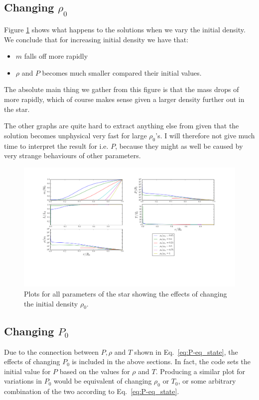 \documentclass[11pt,twocolumn]{article}
\begin{document}
\subsection{Changing $\rho_0$}
Figure \ref{fig:rho-variation} shows what happens to the solutions
when we vary the initial density. We conclude that for increasing
initial density we have that:

\begin{itemize}
\item $m$ falls off more rapidly
\item $\rho$ and $P$ becomes much smaller compared their initial
  values.
\end{itemize}

The absolute main thing we gather from this figure is that the mass
drops of more rapidly, which of course makes sense given a larger
density further out in the star. 

The other graphs are quite hard to extract anything else from given
that the solution becomes unphysical very fast for large
$\rho_0$'s. I will therefore not give much time to interpret the
result for i.e. $P$, because they might as well be caused by very
strange behaviours of other parameters. 

\begin{figure}[ht]
  \centering
  \includegraphics[width=\linewidth]{fig/rho_variation.png}
  \caption{\label{fig:rho-variation} Plots for all parameters of the star
  showing the effects of changing the initial density $\rho_0$.}
\end{figure}

\subsection{Changing $P_0$}
Due to the connection between $P,\rho$ and $T$ shown in
Eq.~\eqref{eq:P-eq_state}, the effects of changing $P_0$ is included
in the above sections. In fact, the code sets the initial value for
$P$ based on the values for $\rho$ and $T$. Producing a similar plot
for variations in $P_0$ would be equivalent of changing $\rho_0$ or
$T_0$, or some arbitrary combination of the two according to Eq.~\eqref{eq:P-eq_state}.
\end{document}
